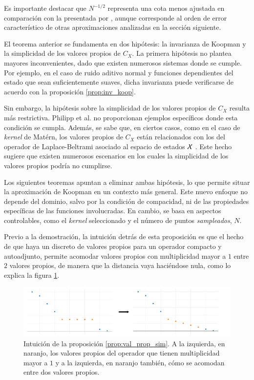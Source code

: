 Es importante destacar que \( N^{-1/2} \) representa una cota menos ajustada en comparación con la presentada por \cite{Philipp2024ErrorOperator}, aunque corresponde al orden de error característico de otras aproximaciones analizadas en la sección siguiente.

El teorema anterior se fundamenta en dos hipótesis: la invarianza de Koopman y la simplicidad de los valores propios de \( C_X \). La primera hipótesis no plantea mayores inconvenientes, dado que existen numerosos sistemas donde se cumple. Por ejemplo, en el caso de ruido aditivo normal y funciones dependientes del estado que sean suficientemente suaves, dicha invarianza puede verificarse de acuerdo con la proposición \ref{prop:inv_koop}.

Sin embargo, la hipótesis sobre la simplicidad de los valores propios de \( C_X \) resulta más restrictiva. Philipp et al. no proporcionan ejemplos específicos donde esta condición se cumpla. Además, se sabe que, en ciertos casos, como en el caso de \textit{kernel} de Matérn, los valores propios de \( C_X \) están relacionados con los del operador de Laplace-Beltrami asociado al espacio de estados \( \mathcal{X} \) \cite{Whittle1963StochasticDimensions, Borovitskiy2020MaternManifolds}. Este hecho sugiere que existen numerosos escenarios en los cuales la simplicidad de los valores propios podría no cumplirse.

Los siguientes teoremas apuntan a eliminar ambas hipótesis, lo que permite situar la aproximación de Koopman en un contexto más general. Este nuevo enfoque no depende del dominio, salvo por la condición de compacidad, ni de las propiedades específicas de las funciones involucradas. En cambio, se basa en aspectos controlables, como el \textit{kernel} seleccionado y el número de puntos \textit{sampleados}, \( N \).

Previo a la demostración, la intuición detrás de esta proposición es que el hecho de que haya un discreto de valores propios para un operador compacto y autoadjunto, permite acomodar valores propios con multiplicidad mayor a $1$ entre $2$ valores propios, de manera que la distancia vaya haciéndose nula, como lo explica la figura \ref{fig:simple_eig_vals}.

\begin{figure}[h!]
    \centering
    \includegraphics[width=1.0\linewidth]{img/content/chapter3/simple_eig_vals.pdf}
    \caption{Intuición de la proposición \ref{prop:val_prop_sim}. A la izquierda, en naranjo, los valores propios del operador que tienen multiplicidad mayor a $1$ y a la izquierda, en naranjo también, cómo se acomodan entre dos valores propios.}
    \label{fig:simple_eig_vals}
\end{figure}

